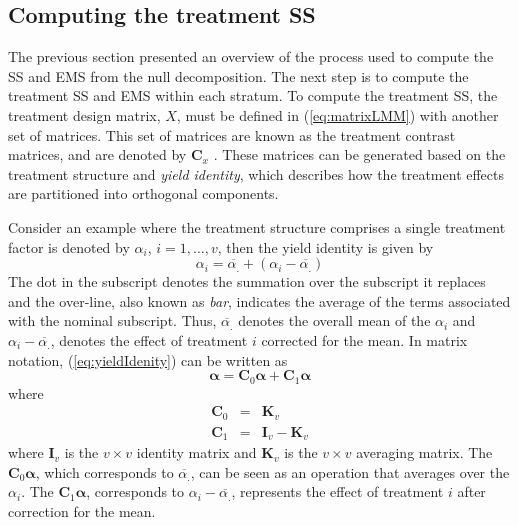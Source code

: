 \documentclass[article]{jss}
\newcommand{\I}{\mathbf{I}}
\newcommand{\K}{\mathbf{K}}
\newcommand{\C}{\mathbf{C}}
\begin{document}
\subsection{Computing the treatment SS}
\label{subsec:estTrt}
The previous section presented an overview of the process used to compute the SS and EMS from the null decomposition. The next step is to compute the treatment SS and EMS within each stratum. To compute the treatment SS, the treatment design matrix, $X$, must be defined in (\ref{eq:matrixLMM}) with another set of matrices. This set of matrices are known as the treatment contrast matrices, and are denoted by $\C_x$ \citep{John1987}. These matrices can be generated based on the treatment structure and \emph{yield identity}, which describes how the treatment effects are partitioned into orthogonal components. 

Consider an example where the treatment structure comprises a single treatment factor is denoted by $\alpha_i$, $i= 1,\dots, v$, then the yield identity is given by
\begin{equation}\label{eq:yieldIdenity}
\alpha_{i} = \overline{\alpha_{.}}+(\alpha_{i} -\overline{\alpha_{.}})
\end{equation}
The dot in the subscript denotes the summation over the subscript it replaces and the over-line, also known as \emph{bar}, indicates the average of the terms associated with the nominal subscript. Thus, $\overline{\alpha_{.}}$ denotes the overall mean of the $\alpha_i$ and $\alpha_{i} -\overline{\alpha_{.}}$, denotes the effect of treatment $i$ corrected for the mean. In matrix notation, (\ref{eq:yieldIdenity}) can be written as 
\[
\bm{\alpha} = \C_0 \bm{\alpha} + \C_1 \bm{\alpha}
\]
where
\begin{eqnarray}
\nonumber \C_0 &=& \K_v\\
\nonumber \C_1 &=& \I_v - \K_v
\end{eqnarray}
where $\I_v$ is the $v \times v$ identity matrix and $\K_v$ is the $v \times v$ averaging matrix. The $\C_0 \bm{\alpha} $, which corresponds to $\overline{\alpha_{.}}$, can be seen as an operation that averages over the $\alpha_i$. The $\C_1\bm{\alpha}$, corresponds to $\alpha_{i} - \overline{\alpha_{.}}$, represents the effect of treatment $i$ after correction for the mean.
\end{document}
